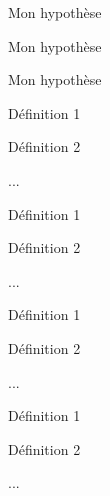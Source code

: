 \documentclass[a4paper,12pt]{article}
\begin{document}
\begin{hypothese}
	Mon hypothèse
\end{hypothese}%


\begin{code}%
\begin{hypothese*}
	Mon hypothèse
\end{hypothese*}
\end{code}

\begin{hypothese*}
	Mon hypothèse
\end{hypothese*}%

\begin{code}%
\begin{hypotheses}
	\item Définition 1
	\item Définition 2
	\item ...
\end{hypotheses}
\end{code}

\begin{hypotheses}
	\item Définition 1
	\item Définition 2
	\item ...
\end{hypotheses}%

\begin{code}%
\begin{hypotheses*}
	\item Définition 1
	\item Définition 2
	\item ...
\end{hypotheses*}
\end{code}

\begin{hypotheses*}
	\item Définition 1
	\item Définition 2
	\item ...
\end{hypotheses*}%
\end{document}
